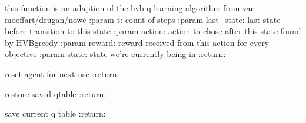 \documentclass[letterpaper,10pt,english]{sphinxmanual}
\begin{document}
\begin{fulllineitems}
\begin{fulllineitems}
\end{fulllineitems}


\begin{fulllineitems}
\label{Agents:morl_agents.MORLHVBAgent.learn}
this function is an adaption of the hvb q learning algorithm from van moeffart/drugan/nowé
:param t: count of steps
:param last\_state: last state before transition to this state
:param action: action to chose after this state found by HVBgreedy
:param reward: reward received from this action for every objective
:param state: state we're currently being in
:return:

\end{fulllineitems}


\begin{fulllineitems}
\label{Agents:morl_agents.MORLHVBAgent.reset}
reset agent for next use
:return:

\end{fulllineitems}


\begin{fulllineitems}
\label{Agents:morl_agents.MORLHVBAgent.restore}
restore saved qtable
:return:

\end{fulllineitems}


\begin{fulllineitems}
\label{Agents:morl_agents.MORLHVBAgent.save}
save current q table
:return:

\end{fulllineitems}


\end{fulllineitems}

\end{document}
